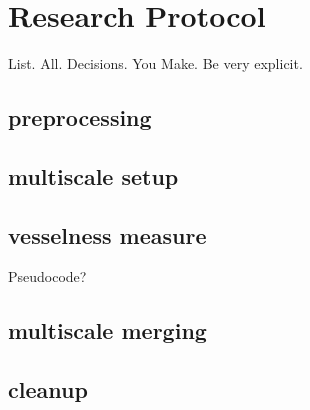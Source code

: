 \chapter{Research Protocol}
List. All. Decisions. You Make. Be very explicit.

\section{preprocessing}
\section{multiscale setup}
\section{vesselness measure}
Pseudocode?
\section{multiscale merging}
\section{cleanup}
